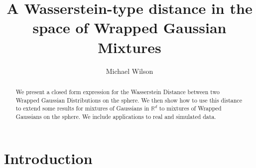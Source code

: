 \documentclass[]{article}
\title{A Wasserstein-type distance in the space of Wrapped Gaussian Mixtures}
\author{Michael Wilson}
\date{}
\begin{document}
	
	\maketitle
	
	\begin{abstract}
	We present a closed form expression for the Wasserstein Distance between two Wrapped Gaussian Distributions on the sphere. We then show how to use this distance to extend some results for mixtures of Gaussians in $\mathbb{R}^d$ to mixtures of Wrapped Gaussians on the sphere. We include applications to real and simulated data. 
	\end{abstract}

\section{Introduction}

%
\end{document}
